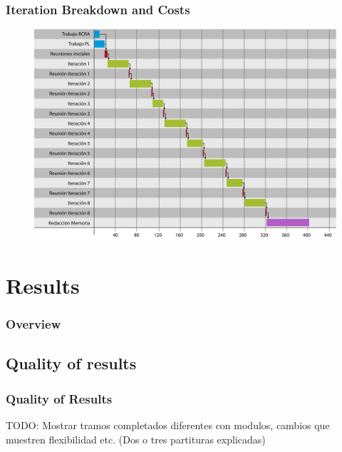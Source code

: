 \documentclass[english]{beamer}
\begin{document}
	\begin{frame}
		\frametitle{Iteration Breakdown and Costs}
		\begin{figure}
		\centering
		\includegraphics[width=0.7\linewidth]{imagenes/diagrama_tareas.pdf}
		\end{figure}
		
				\begin{table}
				\centering
				\end{table}
	\end{frame}

\section{Results}
\begin{frame}
	\frametitle{Overview}
\end{frame}
\subsection{Quality of results}
\begin{frame}
	\frametitle{Quality of Results}
	TODO: Mostrar tramos completados diferentes con modulos, cambios que muestren flexibilidad etc. (Dos o tres partituras explicadas)
\end{frame}
\end{document}
